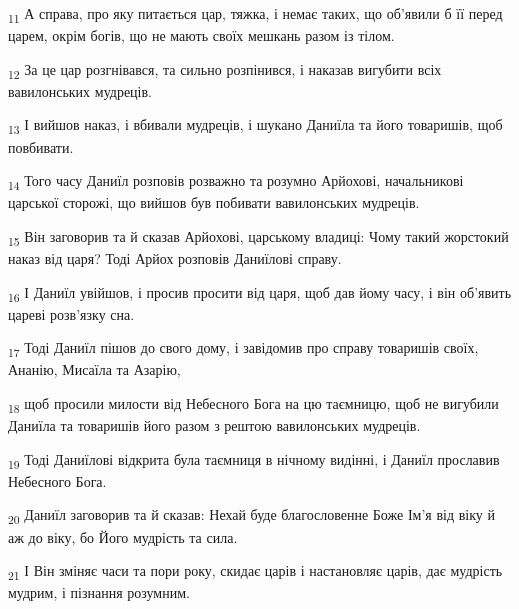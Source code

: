 \begin{tcolorbox}
\textsubscript{11} А справа, про яку питається цар, тяжка, і немає таких, що об'явили б її перед царем, окрім богів, що не мають своїх мешкань разом із тілом.
\end{tcolorbox}
\begin{tcolorbox}
\textsubscript{12} За це цар розгнівався, та сильно розпінився, і наказав вигубити всіх вавилонських мудреців.
\end{tcolorbox}
\begin{tcolorbox}
\textsubscript{13} І вийшов наказ, і вбивали мудреців, і шукано Даниїла та його товаришів, щоб повбивати.
\end{tcolorbox}
\begin{tcolorbox}
\textsubscript{14} Того часу Даниїл розповів розважно та розумно Арйохові, начальникові царської сторожі, що вийшов був побивати вавилонських мудреців.
\end{tcolorbox}
\begin{tcolorbox}
\textsubscript{15} Він заговорив та й сказав Арйохові, царському владиці: Чому такий жорстокий наказ від царя? Тоді Арйох розповів Даниїлові справу.
\end{tcolorbox}
\begin{tcolorbox}
\textsubscript{16} І Даниїл увійшов, і просив просити від царя, щоб дав йому часу, і він об'явить цареві розв'язку сна.
\end{tcolorbox}
\begin{tcolorbox}
\textsubscript{17} Тоді Даниїл пішов до свого дому, і завідомив про справу товаришів своїх, Ананію, Мисаїла та Азарію,
\end{tcolorbox}
\begin{tcolorbox}
\textsubscript{18} щоб просили милости від Небесного Бога на цю таємницю, щоб не вигубили Даниїла та товаришів його разом з рештою вавилонських мудреців.
\end{tcolorbox}
\begin{tcolorbox}
\textsubscript{19} Тоді Даниїлові відкрита була таємниця в нічному видінні, і Даниїл прославив Небесного Бога.
\end{tcolorbox}
\begin{tcolorbox}
\textsubscript{20} Даниїл заговорив та й сказав: Нехай буде благословенне Боже Ім'я від віку й аж до віку, бо Його мудрість та сила.
\end{tcolorbox}
\begin{tcolorbox}
\textsubscript{21} І Він зміняє часи та пори року, скидає царів і настановляє царів, дає мудрість мудрим, і пізнання розумним.
\end{tcolorbox}
